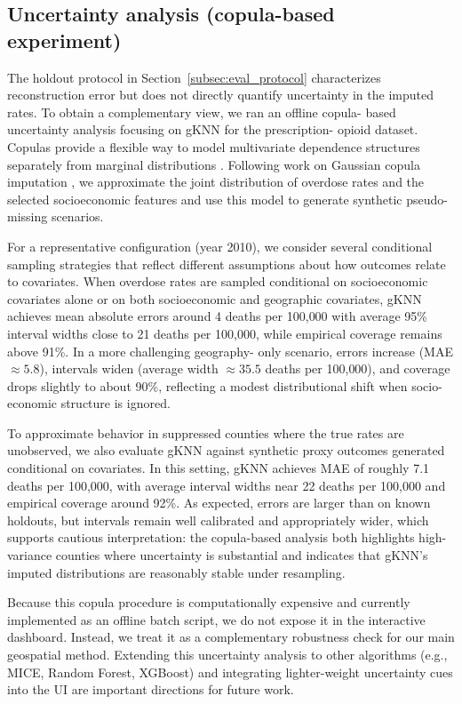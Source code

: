 \documentclass{egpubl}
\begin{document}
\subsection{Uncertainty analysis (copula-based experiment)}
\label{subsec:uncertainty}
The holdout protocol in Section~\ref{subsec:eval_protocol} characterizes reconstruction error but does not directly quantify uncertainty in the imputed rates. To obtain a complementary view, we ran an offline copula- based uncertainty analysis focusing on gKNN for the prescription- opioid dataset. Copulas provide a flexible way to model multivariate dependence structures separately from marginal distributions \cite{nelsen2006introduction,joe2014dependence}. Following work on Gaussian copula imputation \cite{hollenbach2021multiple}, we approximate the joint distribution of overdose rates and the selected socioeconomic features and use this model to generate synthetic pseudo-missing scenarios.

For a representative configuration (year 2010), we consider several conditional sampling strategies that reflect different assumptions about how outcomes relate to covariates. When overdose rates are sampled conditional on socioeconomic covariates alone or on both socioeconomic and geographic covariates, gKNN achieves mean absolute errors around 4 deaths per 100{,}000 with average 95\% interval widths close to 21 deaths per 100{,}000, while empirical coverage remains above 91\%. In a more challenging geography- only scenario, errors increase (MAE $\approx 5.8$), intervals widen (average width $\approx 35.5$ deaths per 100{,}000), and coverage drops slightly to about 90\%, reflecting a modest distributional shift when socio-economic structure is ignored.

To approximate behavior in suppressed counties where the true rates are unobserved, we also evaluate gKNN against synthetic proxy outcomes generated conditional on covariates. In this setting, gKNN achieves MAE of roughly 7.1 deaths per 100{,}000, with average interval widths near 22 deaths per 100{,}000 and empirical coverage around 92\%. As expected, errors are larger than on known holdouts, but intervals remain well calibrated and appropriately wider, which supports cautious interpretation: the copula-based analysis both highlights high-variance counties where uncertainty is substantial and indicates that gKNN’s imputed distributions are reasonably stable under resampling.

Because this copula procedure is computationally expensive and currently implemented as an offline batch script, we do not expose it in the interactive dashboard. Instead, we treat it as a complementary robustness check for our main geospatial method. Extending this uncertainty analysis to other algorithms (e.g., MICE, Random Forest, XGBoost) and integrating lighter-weight uncertainty cues into the UI are important directions for future work.
\vspace{-4pt}
\end{document}
